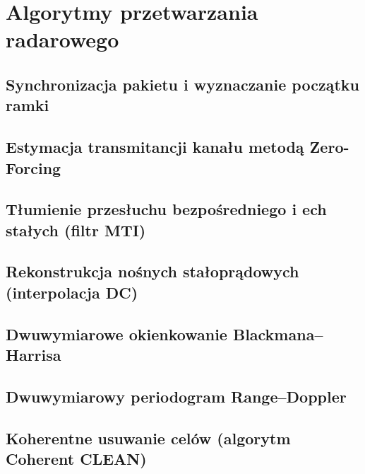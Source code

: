 \section{Algorytmy przetwarzania radarowego}
\label{sec:radar_dsp}


\subsection{Synchronizacja pakietu i wyznaczanie początku ramki}
\label{subsec:dsp_sync}

\subsection{Estymacja transmitancji kanału metodą Zero-Forcing}
\label{subsec:dsp_zero_forcing}

\subsection{Tłumienie przesłuchu bezpośredniego i ech stałych (filtr MTI)}
\label{subsec:dsp_mti}

\subsection{Rekonstrukcja nośnych stałoprądowych (interpolacja DC)}
\label{subsec:dsp_dc_interp}

\subsection{Dwuwymiarowe okienkowanie Blackmana--Harrisa}
\label{subsec:dsp_windowing}

\subsection{Dwuwymiarowy periodogram Range--Doppler}
\label{subsec:dsp_2d_periodogram}

\subsection{Koherentne usuwanie celów (algorytm Coherent CLEAN)}
\label{subsec:dsp_clean}
